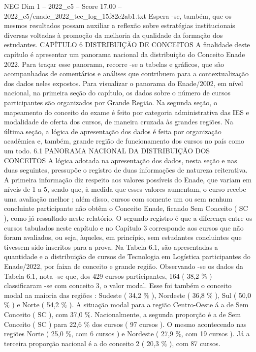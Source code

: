 \begin{textsample}{NEG Dim 1 – 2022\_c5 – Score 17.00 – 2022\_c5/enade\_2022\_tec\_log\_15f82e2ab1.txt}
Espera -se, também, que os mesmos resultados possam auxiliar a reflexão sobre estratégias institucionais diversas voltadas à promoção da melhoria da qualidade da formação dos estudantes.
CAPÍTULO 6 DISTRIBUIÇÃO DE CONCEITOS A finalidade deste capítulo é apresentar um panorama nacional da distribuição do Conceito Enade 2022.
Para traçar esse panorama, recorre -se a tabelas e gráficos, que são acompanhados de comentários e análises que contribuem para a contextualização dos dados neles expostos.
Para visualizar o panorama do Enade/2002, em nível nacional, na primeira seção do capítulo, os dados sobre o número de cursos participantes são organizados por Grande Região.
Na segunda seção, o mapeamento do conceito do exame é feito por categoria administrativa das IES e modalidade de oferta dos cursos, de maneira cruzada às grandes regiões.
Na última seção, a lógica de apresentação dos dados é feita por organização acadêmica e, também, grande região de funcionamento dos cursos no país como um todo. 6.1 PANORAMA NACIONAL DA DISTRIBUIÇÃO DOS CONCEITOS A lógica adotada na apresentação dos dados, nesta seção e nas duas seguintes, pressupõe o registro de duas informações de natureza reiterativa.
A primeira informação diz respeito aos valores possíveis do Enade, que variam em níveis de 1 a 5, sendo que, à medida que esses valores aumentam, o curso recebe uma avaliação melhor ; além disso, cursos com somente um ou sem nenhum concluinte participante não obtêm o Conceito Enade, ficando Sem Conceito ( SC ), como já ressaltado neste relatório.
O segundo registro é que a diferença entre os cursos tabulados neste capítulo e no Capítulo 3 corresponde aos cursos que não foram avaliados, ou seja, àqueles, em princípio, sem estudantes concluintes que tivessem sido inscritos para a prova.
Na Tabela 6.1, são apresentadas a quantidade e a distribuição de cursos de Tecnologia em Logística participantes do Enade/2022, por faixa de conceito e grande região.
Observando -se os dados da Tabela 6.1, nota -se que, dos 429 cursos participantes, 164 ( 38,2 \% ) classificaram -se com conceito 3, o valor modal.
Esse foi também o conceito modal na maioria das regiões : Sudeste ( 34,2 \% ), Nordeste ( 36,8 \% ), Sul ( 50,0 \% ) e Norte ( 54,2 \% ).
A situação modal para a região Centro-Oeste á a de Sem Conceito ( SC ), com 37,0 \%.
Nacionalmente, a segunda proporção é a de Sem Conceito ( SC ) para 22,6 \% dos cursos ( 97 cursos ).
O mesmo acontecendo nas regiões Norte ( 25,0 \%, com 6 cursos ) e Nordeste ( 27,9 \%, com 19 cursos ).
Já a terceira proporção nacional é a do conceito 2 ( 20,3 \% ), com 87 cursos.

\end{textsample}

